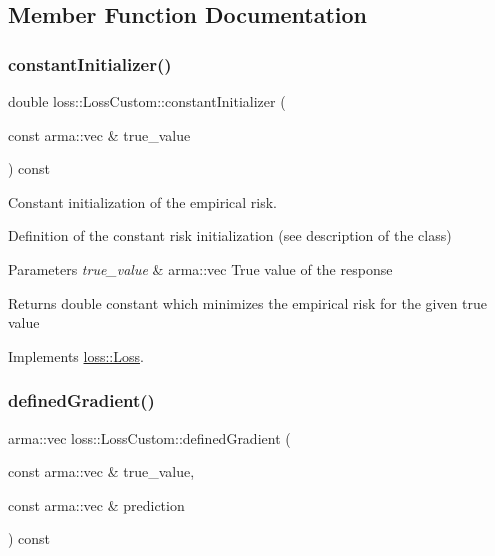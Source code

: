 \subsection{Member Function Documentation}
\mbox{\label{classloss_1_1_loss_custom_a0c8abe2bf210898813d2f9e5049cc1e8}} 
\subsubsection{\texorpdfstring{constant\+Initializer()}{constantInitializer()}}
{\footnotesize\ttfamily double loss\+::\+Loss\+Custom\+::constant\+Initializer (\begin{DoxyParamCaption}\item[{const arma\+::vec \&}]{true\+\_\+value }\end{DoxyParamCaption}) const\hspace{0.3cm}{\ttfamily [virtual]}}



Constant initialization of the empirical risk. 

Definition of the constant risk initialization (see description of the class)


\begin{DoxyParams}{Parameters}
{\em true\+\_\+value} & {\ttfamily arma\+::vec} True value of the response\\
\hline
\end{DoxyParams}
\begin{DoxyReturn}{Returns}
{\ttfamily double} constant which minimizes the empirical risk for the given true value 
\end{DoxyReturn}


Implements \hyperlink{classloss_1_1_loss_a65fe7dcd9370e6a549b8d1cc95fc8798}{loss\+::\+Loss}.

\mbox{\label{classloss_1_1_loss_custom_a91761ef42f85914dde2c3e6dd7fa1a0c}} 
\subsubsection{\texorpdfstring{defined\+Gradient()}{definedGradient()}}
{\footnotesize\ttfamily arma\+::vec loss\+::\+Loss\+Custom\+::defined\+Gradient (\begin{DoxyParamCaption}\item[{const arma\+::vec \&}]{true\+\_\+value,  }\item[{const arma\+::vec \&}]{prediction }\end{DoxyParamCaption}) const\hspace{0.3cm}{\ttfamily [virtual]}}




